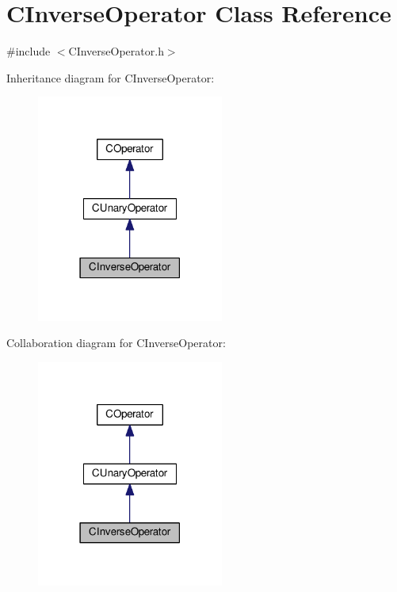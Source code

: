 \hypertarget{classCInverseOperator}{}\section{C\+Inverse\+Operator Class Reference}
\label{classCInverseOperator}


{\ttfamily \#include $<$C\+Inverse\+Operator.\+h$>$}



Inheritance diagram for C\+Inverse\+Operator\+:\nopagebreak
\begin{figure}[H]
\begin{center}
\leavevmode
\includegraphics[width=174pt]{classCInverseOperator__inherit__graph}
\end{center}
\end{figure}


Collaboration diagram for C\+Inverse\+Operator\+:\nopagebreak
\begin{figure}[H]
\begin{center}
\leavevmode
\includegraphics[width=174pt]{classCInverseOperator__coll__graph}
\end{center}
\end{figure}
